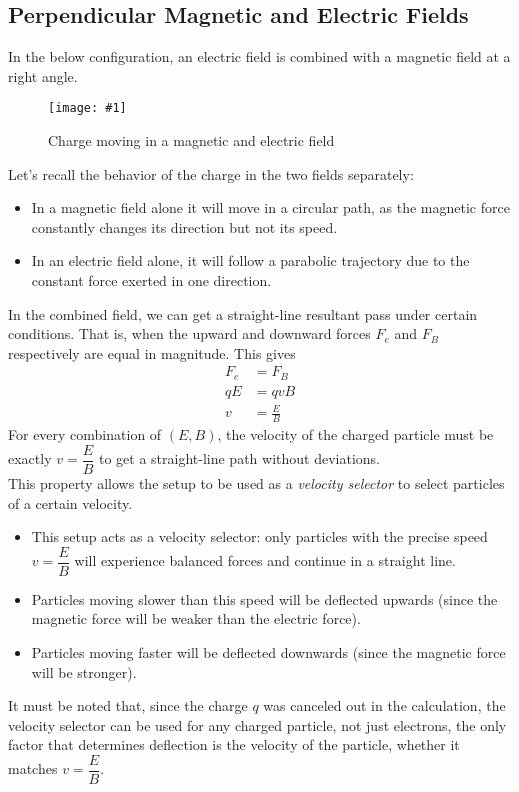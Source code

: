 \documentclass[a4paper,12pt]{article}
\newcommand{\lb}{\\[8pt]}
\newcommand{\img}[4]{\begin{center}
  \begin{figure}[H]
    \centering
    \texttt{[image: \#1]}
    \caption{#3}
    \label{fig:#4}
  \end{figure}
\end{center}}
\begin{document}
\subsection{Perpendicular Magnetic and Electric Fields}
In the below configuration, an electric field is combined with a magnetic field at a right angle.

\img{move3.png}{0.6}{Charge moving in a magnetic and electric field}{move3}

Let's recall the behavior of the charge in the two fields separately:
\begin{itemize}
  \item In a magnetic field alone it will move in a circular path, as the magnetic force constantly changes its direction but not its speed.
  \item In an electric field alone, it will follow a parabolic trajectory due to the constant force exerted in one direction.
\end{itemize}

In the combined field, we can get a straight-line resultant pass under certain conditions. That is, when the upward and downward forces $F_e$ and $F_B$ respectively are equal in magnitude. This gives \begin{align*}
  F_e & = F_B         \\
  qE  & = qvB         \\
  v   & = \frac{E}{B}
\end{align*}
For every combination of $(E, B)$, the velocity of the charged particle must be exactly $v = \dfrac{E}{B}$ to get a straight-line path without deviations.\lb
This property allows the setup to be used as a \textit{velocity selector} to select particles of a certain velocity.
\begin{itemize}
  \item This setup acts as a velocity selector: only particles with the precise speed $v = \dfrac{E}{B}$ will experience balanced forces and continue in a straight line.
  \item Particles moving slower than this speed will be deflected upwards (since the magnetic force will be weaker than the electric force).
  \item Particles moving faster will be deflected downwards (since the magnetic force will be stronger).
\end{itemize}
It must be noted that, since the charge $q$ was canceled out in the calculation, the velocity selector can be used for any charged particle, not just electrons, the only factor that determines deflection is the velocity of the particle, whether it matches $v = \dfrac{E}{B}$.
\end{document}
